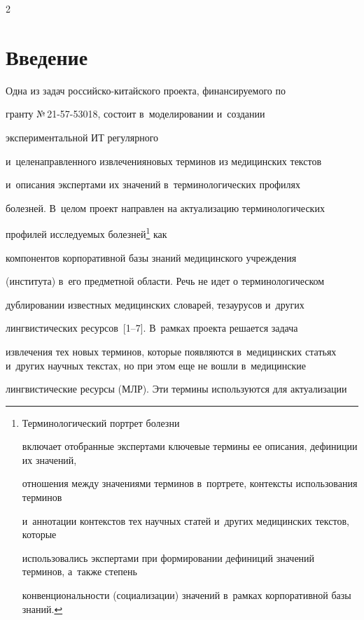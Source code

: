 \begin{multicols}{2}



\label{st\stat}



\section{Введение}



  Одна из задач российско-ки\-тай\-ско\-го проекта, финансируемого по 

гранту №\,21-57-53018, состоит в~моделировании и~создании 

экспериментальной ИТ регулярного 

и~целенаправленного извлечения\linebreak новых терминов из медицинских текстов 

и~описания экспертами их значений в~терминологических профилях 

болезней. В~целом проект направлен на актуализацию терминологических 

\mbox{профилей} исследуемых болезней\footnote[5]{Терминологический портрет болезни 

включает отобранные экспертами ключевые термины ее описания, дефиниции их значений, 

отношения между значениями терминов в~портрете, контексты использования терминов 

и~аннотации контекстов тех научных статей и~других медицинских текстов, которые 

использовались экспертами при формировании дефиниций значений терминов, а~также степень 

конвенциональности (социализации) значений в~рамках корпоративной базы знаний.} как 

компонентов корпоративной базы знаний медицинского учреждения 

(института) в~его предметной об\-ласти. Речь не идет о терминологическом 

дублировании известных \mbox{медицинских} словарей, тезаурусов и~других 

лингвистических ресурсов~[1--7]. В~рамках проекта решается задача 

извлечения тех новых терминов, которые появляются в~медицинских статьях и~других научных текстах, но при этом еще не вошли в~медицинские 

лингвистические ресурсы (МЛР). Эти термины используются для актуализации 


\end{multicols}
